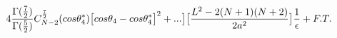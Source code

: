\begin{equation}
4\frac{\Gamma(\frac{7}{2})}{\Gamma(\frac{5}{2})}C_{N-2}^{\frac{7}{2}}(cos{\theta_4^*})
\big{[}cos\theta_4 - cos\theta_4^*\big{]}^2 + ...\big{]}
\big{[}\frac{L^2 - 2(N + 1)(N + 2)}{2a^{2}}\big{]}
\frac{1}{\epsilon} + F. T.
\end{equation}

